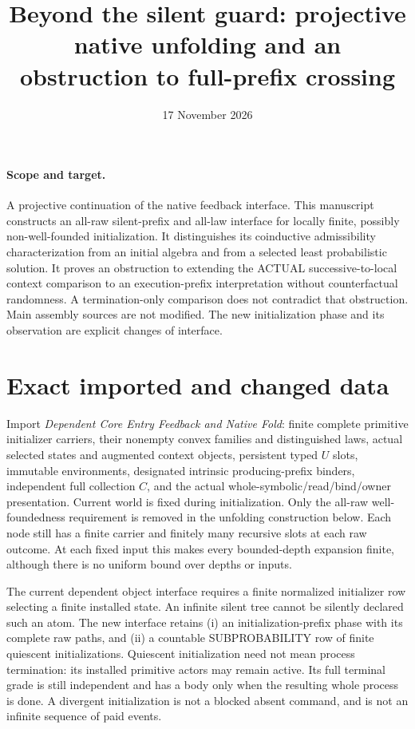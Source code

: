 \documentclass[11pt]{article}
\title{Beyond the silent guard: projective native unfolding and an obstruction to full-prefix crossing}
\date{17 November 2026}
\begin{document}
\maketitle
\paragraph{Scope and target.} A projective continuation of the native feedback interface. This manuscript constructs an all-raw silent-prefix and all-law interface for locally finite, possibly non-well-founded initialization. It distinguishes its coinductive admissibility characterization from an initial algebra and from a selected least probabilistic solution. It proves an obstruction to extending the ACTUAL successive-to-local context comparison to an execution-prefix interpretation without counterfactual randomness. A termination-only comparison does not contradict that obstruction. Main assembly sources are not modified. The new initialization phase and its observation are explicit changes of interface.

\section{Exact imported and changed data}
Import \emph{Dependent Core Entry Feedback and Native Fold}:
finite complete primitive initializer carriers, their nonempty convex families and distinguished laws, actual selected states and augmented context objects, persistent typed $U$ slots, immutable environments, designated intrinsic producing-prefix binders, independent full collection $C$, and the actual whole-symbolic/read/bind/owner presentation. Current world is fixed during initialization. Only the all-raw well-foundedness requirement is removed in the unfolding construction below. Each node still has a finite carrier and finitely many recursive slots at each raw outcome. At each fixed input this makes every bounded-depth expansion finite, although there is no uniform bound over depths or inputs.

The current dependent object interface requires a finite normalized initializer row selecting a finite installed state. An infinite silent tree cannot be silently declared such an atom. The new interface retains (i) an initialization-prefix phase with its complete raw paths, and (ii) a countable SUBPROBABILITY row of finite quiescent initializations. Quiescent initialization need not mean process termination: its installed primitive actors may remain active. Its full terminal grade is still independent and has a body only when the resulting whole process is done. A divergent initialization is not a blocked absent command, and is not an infinite sequence of paid events.
\end{document}
